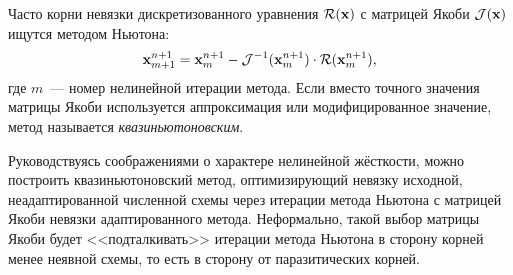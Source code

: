 Часто корни невязки дискретизованного уравнения $ \mathcal{R}(\mathbf{x}) $ с матрицей Якоби $ \mathcal{J}(\mathbf{x}) $
ищутся методом Ньютона:
%
\begin{equation}
    \label{eq:modified_Newton_iteration:Newton_method}
    \mathbf{x}_{m+1}^{n+1} = \mathbf{x}_m^{n+1} - \mathcal{J}^{-1}(\mathbf{x}_m^{n+1}) \cdot \mathcal{R}(\mathbf{x}_m^{n+1}),
\end{equation}
%
где $ m $~--- номер нелинейной итерации метода.
Если вместо точного значения матрицы Якоби используется аппроксимация или модифицированное значение,
метод называется \emph{квазиньютоновским}.

Руководствуясь соображениями о характере нелинейной жёсткости,
можно построить квазиньютоновский метод,
оптимизирующий невязку исходной, неадаптированной численной схемы
через итерации метода Ньютона с матрицей Якоби
невязки адаптированного метода.
Неформально, такой выбор матрицы Якоби будет <<подталкивать>> итерации метода Ньютона в сторону
корней менее неявной схемы, то есть в сторону от паразитических корней.
